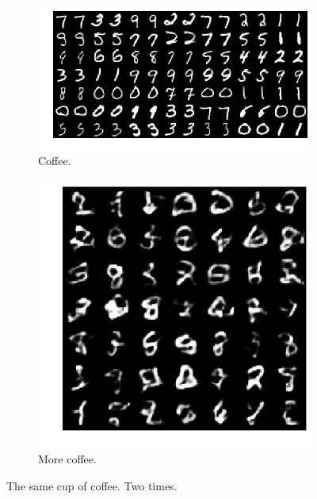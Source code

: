 \begin{figure}[h!]
  \centering
  \begin{subfigure}[b]{0.57\linewidth}
    \includegraphics[width=\linewidth]{images/mnist_recon}
    \caption{Coffee.}
  \end{subfigure}
  \begin{subfigure}[b]{0.30\linewidth}
    \includegraphics[width=\linewidth]{images/mnist_gen}
    \caption{More coffee.}
  \end{subfigure}
  \caption{The same cup of coffee. Two times.}
  \label{fig:vae}
\end{figure}

